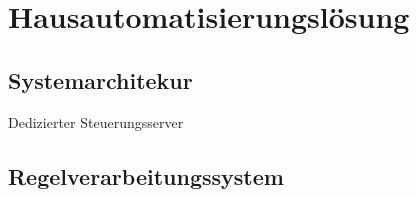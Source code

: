 \section{Hausautomatisierungslösung}
\myContentSectionFrame[\thesection - 6]


\subsection{Systemarchitekur}{Dedizierter Steuerungsserver}


\begin{frame}[label=netzwerkaufbau]{\insertsubsection}{}

\end{frame}





\subsection[Regelwerk]{Regelverarbeitungssystem}

